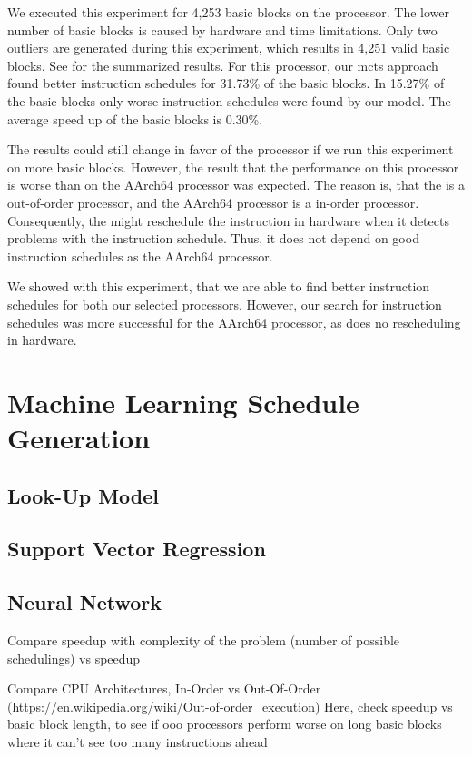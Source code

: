 We executed this experiment for 4,253 basic blocks on the \aurora processor.
The lower number of basic blocks is caused by hardware and time limitations.
Only two outliers are generated during this experiment, which results in 4,251 valid basic blocks.
See  for the summarized results.
For this processor, our \ac{mcts} approach found better instruction schedules for 31.73\% of the basic blocks.
In 15.27\% of the basic blocks only worse instruction schedules were found by our model.
The average speed up of the basic blocks is 0.30\%.

The results could still change in favor of the \aurora processor if we run this experiment on more basic blocks.
However, the result that the performance on this processor is worse than on the AArch64 processor was expected.
The reason is, that the \aurora is a out-of-order processor, and the AArch64 processor is a in-order processor.
Consequently, the \aurora might reschedule the instruction in hardware when it detects problems with the instruction schedule.
Thus, it does not depend on good instruction schedules as the AArch64 processor.

We showed with this experiment, that we are able to find better instruction schedules for both our selected processors.
However, our search for instruction schedules was more successful for the AArch64 processor, as does no rescheduling in hardware.

\section{Machine Learning Schedule Generation}
\subsection{Look-Up Model}
\subsection{Support Vector Regression}
\subsection{Neural Network}

Compare speedup with complexity of the problem (number of possible schedulings) vs speedup

Compare CPU Architectures, In-Order vs Out-Of-Order (\url{https://en.wikipedia.org/wiki/Out-of-order_execution})
Here, check speedup vs basic block length, to see if ooo processors perform worse on long basic blocks where it can't see too many instructions ahead

